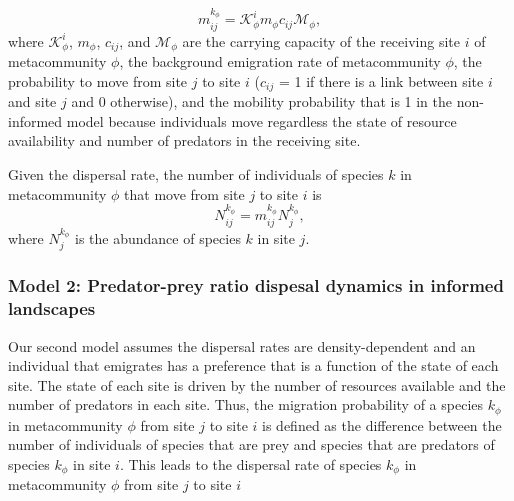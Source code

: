 \begin{equation}
  m^{k_{\phi}}_{ij} = \mathcal{K}^{i}_{\phi} m_{\phi} c_{ij} \mathcal{M}_{\phi},
\end{equation}
where $\mathcal{K}^{i}_{\phi}$, $m_{\phi}$, $c_{ij}$, and
$\mathcal{M}_{\phi}$ are the carrying capacity of the receiving site
$i$ of metacommunity $\phi$, the background emigration rate of
metacommunity $\phi$, the probability to move from site $j$ to site
$i$ ($c_{ij}$ = 1 if there is a link between site $i$ and site $j$ and
0 otherwise), and the mobility probability that is 1 in the
non-informed model because individuals move regardless the state of
resource availability and number of predators in the receiving site.

Given the dispersal rate, the number of individuals of species $k$ in
metacommunity $\phi$ that move from site $j$ to site $i$ is
\begin{equation}
  N^{k_{\phi}}_{ij} =  m^{k_{\phi}}_{ij}  N^{k_{\phi}}_{j},
\end{equation}
where $N^{k_{\phi}}_{j}$ is the abundance of species $k$ in site $j$.




\subsubsection{Model 2: Predator-prey ratio dispesal dynamics in informed landscapes}

Our second model assumes the dispersal rates are density-dependent and
an individual that emigrates has a preference that is a function of
the state of each site. The state of each site is driven by the number
of resources available and the number of predators in each site. Thus,
the migration probability of a species $k_{\mathcal{\phi}}$ in
metacommunity $\mathcal{\phi}$ from site $j$ to site $i$ is defined as
the difference between the number of individuals of species that are
prey and species that are predators of species $k_{\mathcal{\phi}}$ in
site $i$. This leads to the dispersal rate of species
$k_{\mathcal{\phi}}$ in metacommunity $\mathcal{\phi}$ from site $j$
to site $i$

